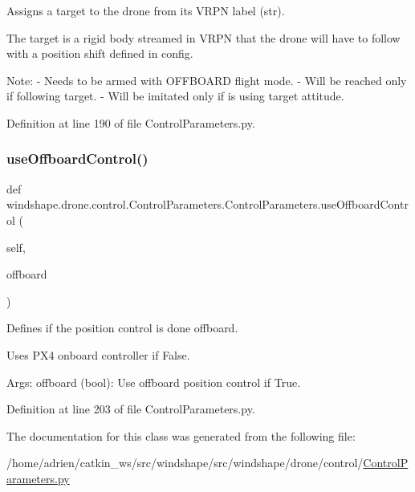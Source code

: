 \begin{DoxyVerb}Assigns a target to the drone from its VRPN label (str).

The target is a rigid body streamed in VRPN that the drone
will have to follow with a position shift defined in config.

Note:
    - Needs to be armed with OFFBOARD flight mode.
    - Will be reached only if following target.
    - Will be imitated only if is using target attitude.
\end{DoxyVerb}
 

Definition at line 190 of file Control\+Parameters.\+py.

\mbox{\label{classwindshape_1_1drone_1_1control_1_1_control_parameters_1_1_control_parameters_ac3e8fcfadece2245111f2e2ceb925c83}} 
\subsubsection{\texorpdfstring{use\+Offboard\+Control()}{useOffboardControl()}}
{\footnotesize\ttfamily def windshape.\+drone.\+control.\+Control\+Parameters.\+Control\+Parameters.\+use\+Offboard\+Control (\begin{DoxyParamCaption}\item[{}]{self,  }\item[{}]{offboard }\end{DoxyParamCaption})}

\begin{DoxyVerb}Defines if the position control is done offboard.

Uses PX4 onboard controller if False.

Args:
    offboard (bool): Use offboard position control if True.
\end{DoxyVerb}
 

Definition at line 203 of file Control\+Parameters.\+py.



The documentation for this class was generated from the following file\+:\begin{DoxyCompactItemize}
\item 
/home/adrien/catkin\+\_\+ws/src/windshape/src/windshape/drone/control/\mbox{\hyperlink{_control_parameters_8py}{Control\+Parameters.\+py}}\end{DoxyCompactItemize}
